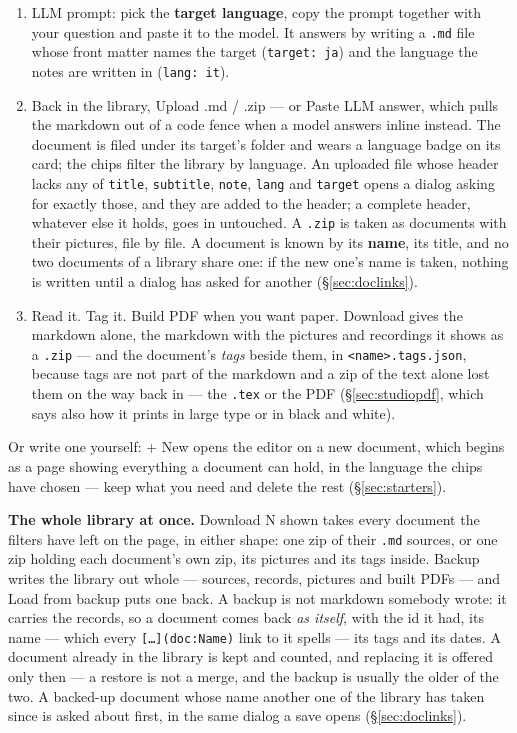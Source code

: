 \documentclass[11pt,oneside]{report}
\newcommand{\file}[1]{\texttt{#1}}
\newcommand{\menu}[1]{\textsf{#1}}
\begin{document}
\begin{enumerate}
\item \menu{LLM prompt}: pick the \textbf{target language}, copy the prompt
  together with your question and paste it to the model. It answers by
  writing a \file{.md} file whose front matter names the target
  (\texttt{target: ja}) and the language the notes are written in
  (\texttt{lang: it}).
\item Back in the library, \menu{Upload .md / .zip} --- or \menu{Paste LLM answer},
  which pulls the markdown out of a code fence when a model answers inline
  instead. The document is filed under its target's folder and wears a
  language badge on its card; the chips filter the library by language. An
  uploaded file whose header lacks any of \texttt{title}, \texttt{subtitle},
  \texttt{note}, \texttt{lang} and \texttt{target} opens a dialog asking for
  exactly those, and they are added to the header; a complete header, whatever
  else it holds, goes in untouched. A \file{.zip} is taken as documents with
  their pictures, file by file. A document is known by its \textbf{name}, its
  title, and no two documents of a library share one: if the new one's name
  is taken, nothing is written until a dialog has asked for another
  (\S\ref{sec:doclinks}).
\item Read it. Tag it. \menu{Build PDF} when you want paper. \menu{Download}
  gives the markdown alone, the markdown with the pictures and recordings it
  shows as a \file{.zip} --- and the document's \emph{tags} beside them, in
  \file{<name>.tags.json}, because tags are not part of the markdown and a zip
  of the text alone lost them on the way back in --- the \file{.tex} or the PDF
  (\S\ref{sec:studiopdf}, which says also how it prints in large type or in
  black and white).
\end{enumerate}

\noindent Or write one yourself: \menu{+ New} opens the editor on a new
document, which begins as a page showing everything a document can hold, in
the language the chips have chosen --- keep what you need and delete the rest
(\S\ref{sec:starters}).

\textbf{The whole library at once.} \menu{Download N shown} takes every
document the filters have left on the page, in either shape: one zip of their
\file{.md} sources, or one zip holding each document's own zip, its pictures
and its tags inside. \menu{Backup} writes the library out whole --- sources,
records, pictures and built PDFs --- and \menu{Load from backup} puts one
back. A backup is not markdown somebody wrote: it carries the records, so a
document comes back \emph{as itself}, with the id it had, its name --- which
every \texttt{[\ldots](doc:Name)} link to it spells --- its tags and its
dates. A document already in the library is kept and counted, and replacing
it is offered only then --- a restore is not a merge, and the backup is
usually the older of the two. A backed-up document whose name another one of
the library has taken since is asked about first, in the same dialog a save
opens (\S\ref{sec:doclinks}).
\end{document}
